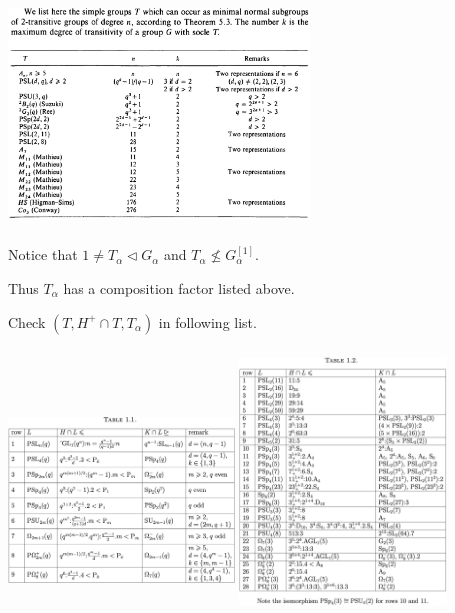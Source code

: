 \documentclass{beamer}
\begin{document}
\begin{frame}
\begin{center}
\includegraphics[width=8cm,height=6cm]{tab2-trans.jpg}
\end{center}
Notice that $1\neq T_\alpha\triangleleft G_\alpha$ and $T_\alpha\not\leq G_\alpha^{[1]}$.

Thus $T_\alpha$ has a composition factor listed above.
\end{frame}

\begin{frame}
Check $(T,H^+\cap T,T_\alpha)$ in following list.

\includegraphics[width=6cm,height=6cm]{tab1.1.jpg}
\includegraphics[width=5.5cm,height=7cm]{tab1.2.jpg}

\end{frame}
\end{document}
